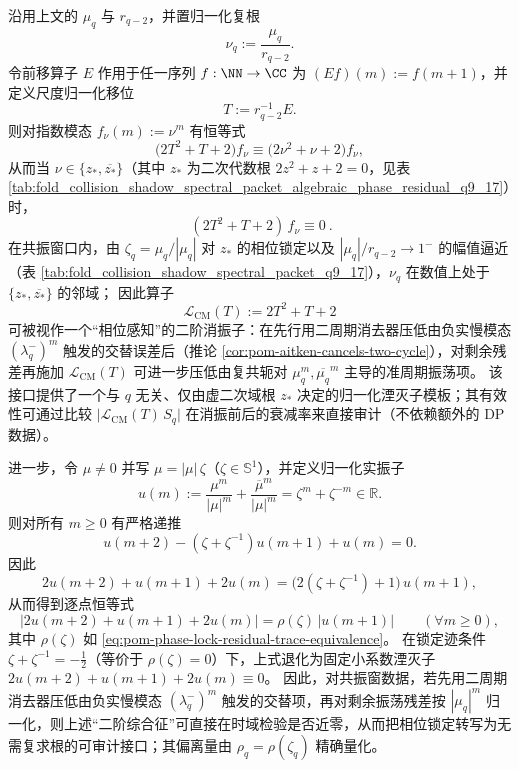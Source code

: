 \begin{remark}\label{rem:pom-cm-annihilator}
沿用上文的 \(\mu_q\) 与 \(r_{q-2}\)，并置归一化复根
\[
\nu_q:=\frac{\mu_q}{r_{q-2}}.
\]
令前移算子 \(E\) 作用于任一序列 \(f:\NN\to\CC\) 为 \((Ef)(m):=f(m+1)\)，并定义尺度归一化移位
\[
T:=r_{q-2}^{-1}E.
\]
则对指数模态 \(f_\nu(m):=\nu^{m}\) 有恒等式
\[
\bigl(2T^2+T+2\bigr)f_\nu
\equiv
\bigl(2\nu^2+\nu+2\bigr)f_\nu,
\]
从而当 \(\nu\in\{z_\ast,\overline{z_\ast}\}\)（其中 \(z_\ast\) 为二次代数根 \(2z^2+z+2=0\)，见表 \ref{tab:fold_collision_shadow_spectral_packet_algebraic_phase_residual_q9_17}）时，
\[
\boxed{\ (2T^2+T+2)\,f_\nu\equiv 0\ }.
\]
在共振窗口内，由 \(\zeta_q=\mu_q/|\mu_q|\) 对 \(z_\ast\) 的相位锁定以及 \(|\mu_q|/r_{q-2}\to 1^{-}\) 的幅值逼近（表 \ref{tab:fold_collision_shadow_spectral_packet_q9_17}），\(\nu_q\) 在数值上处于 \(\{z_\ast,\overline{z_\ast}\}\) 的邻域；
因此算子
\[
\boxed{\ \mathcal L_{\mathrm{CM}}(T):=2T^2+T+2\ }
\]
可被视作一个“相位感知”的二阶消振子：在先行用二周期消去器压低由负实慢模态 \((\lambda_q^-)^m\) 触发的交替误差后（推论 \ref{cor:pom-aitken-cancels-two-cycle}），对剩余残差再施加 \(\mathcal L_{\mathrm{CM}}(T)\) 可进一步压低由复共轭对 \(\mu_q^m,\overline{\mu_q}^m\) 主导的准周期振荡项。
该接口提供了一个与 \(q\) 无关、仅由虚二次域根 \(z_\ast\) 决定的归一化湮灭子模板；其有效性可通过比较
\(
\bigl|\mathcal L_{\mathrm{CM}}(T)\,S_q\bigr|
\)
在消振前后的衰减率来直接审计（不依赖额外的 DP 数据）。
\par
进一步，令 \(\mu\ne 0\) 并写 \(\mu=|\mu|\,\zeta\)（\(\zeta\in\mathbb{S}^1\)），并定义归一化实振子
\[
u(m):=\frac{\mu^{m}}{|\mu|^{m}}+\frac{\overline{\mu}^{m}}{|\mu|^{m}}
=\zeta^{m}+\zeta^{-m}\in\mathbb{R}.
\]
则对所有 \(m\ge 0\) 有严格递推
\[
u(m+2)-(\zeta+\zeta^{-1})u(m+1)+u(m)=0.
\]
因此
\[
2u(m+2)+u(m+1)+2u(m)=\bigl(2(\zeta+\zeta^{-1})+1\bigr)\,u(m+1),
\]
从而得到逐点恒等式
\[
\bigl|2u(m+2)+u(m+1)+2u(m)\bigr|
=\rho(\zeta)\,|u(m+1)|\qquad(\forall m\ge 0),
\]
其中 \(\rho(\zeta)\) 如 \eqref{eq:pom-phase-lock-residual-trace-equivalence}。
在锁定迹条件 \(\zeta+\zeta^{-1}=-\tfrac12\)（等价于 \(\rho(\zeta)=0\)）下，上式退化为固定小系数湮灭子
\(
2u(m+2)+u(m+1)+2u(m)\equiv 0
\)。
因此，对共振窗数据，若先用二周期消去器压低由负实慢模态 \((\lambda_q^-)^m\) 触发的交替项，再对剩余振荡残差按 \(|\mu_q|^m\) 归一化，则上述“二阶综合征”可直接在时域检验是否近零，从而把相位锁定转写为无需复求根的可审计接口；其偏离量由 \(\rho_q=\rho(\zeta_q)\) 精确量化。
\end{remark}

